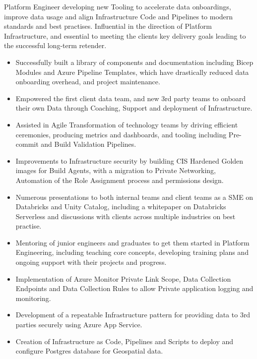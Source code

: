 \documentclass[10pt,a4paper,ragged2e]{maltacv}
\begin{document}
\bigskip


\bigskip

Platform Engineer developing new Tooling to accelerate data onboardings, improve data usage and align Infrastructure Code and Pipelines to modern standards and best practises. Influential in the direction of Platform Infrastructure, and essential to meeting the clients key delivery goals leading to the successful long-term retender.

\bigskip

\begin{itemize}
  \item Successfully built a library of components and documentation including Bicep Modules and Azure Pipeline Templates, which have drastically reduced data onboarding overhead, and project maintenance.
  \item Empowered the first client data team, and new 3rd party teams to onboard their own Data through Coaching, Support and deployment of Infrastructure.
  \item Assisted in Agile Transformation of technology teams by driving efficient ceremonies, producing metrics and dashboards, and tooling including Pre-commit and Build Validation Pipelines.
  \item Improvements to Infrastructure security by building CIS Hardened Golden images for Build Agents, with a migration to Private Networking, Automation of the Role Assignment process and permissions design.
  \item Numerous presentations to both internal teams and client teams as a SME on Databricks and Unity Catalog, including a whitepaper on Databricks Serverless and discussions with clients across multiple industries on best practise.
  \item Mentoring of junior engineers and graduates to get them started in Platform Engineering, including teaching core concepts, developing training plans and ongoing support with their projects and progress.
  \item Implementation of Azure Monitor Private Link Scope, Data Collection Endpoints and Data Collection Rules to allow Private application logging and monitoring.
  \item Development of a repeatable Infrastructure pattern for providing data to 3rd parties securely using Azure App Service.
  \item Creation of Infrastructure as Code, Pipelines and Scripts to deploy and configure Postgres database for Geospatial data.
\end{itemize}
\end{document}
